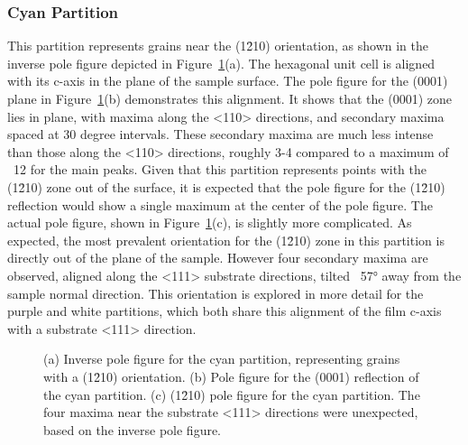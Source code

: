 \documentclass[12pt,%
              twoside,
               letterpaper]{uiothesis}
\begin{document}
\subsubsection{Cyan Partition}
\label{subsubsec:single.growth.cyan}



%
%
			
This partition represents grains near  the (1\={2}10) orientation, as shown in the inverse
pole figure depicted in Figure~\ref{fig:cyanall}(a). The hexagonal unit cell is aligned with
its c-axis in the plane of the sample surface. The pole figure for the (0001) plane in
Figure~\ref{fig:cyanall}(b) demonstrates this alignment. It shows that the (0001) zone lies in
plane, with maxima along the <110> directions, and secondary maxima spaced at 30 degree
intervals. These secondary maxima are much less intense than those along the <110> directions, roughly 3-4  compared to a maximum of ~12 for the main peaks.
Given that this partition represents points with the (1\={2}10) zone out of the surface,
it is expected that the pole figure for the (1\={2}10) reflection would show a single
maximum at the center of the pole figure. The actual pole figure, shown in
Figure~\ref{fig:cyanall}(c), is slightly more complicated. As expected, the most prevalent
orientation for the (1\={2}10) zone in this partition is directly out of the plane of the
sample. However four secondary maxima are observed, aligned along the <111> substrate
directions, tilted ~57\si{\degree} away from the sample normal direction. This orientation
is explored in more detail for the purple and white partitions, which both share this
alignment of the film c-axis with a substrate <111> direction.
\begin{figure}
		\caption[Pole figure for cyan partition]{%
			(a) Inverse pole figure for the cyan partition, representing grains with 
	a (1\={2}10) orientation. (b) Pole figure for the (0001) reflection of the cyan
partition. (c) (1\={2}10) pole figure for the cyan partition. The four maxima near 
	the substrate <111> directions were unexpected, based on the inverse 
	pole figure.}
	\label{fig:cyanall}
\end{figure}
\end{document}
